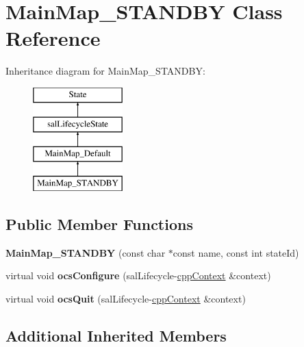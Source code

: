 \hypertarget{class_main_map___s_t_a_n_d_b_y}{\section{Main\-Map\-\_\-\-S\-T\-A\-N\-D\-B\-Y Class Reference}
\label{class_main_map___s_t_a_n_d_b_y}
}
Inheritance diagram for Main\-Map\-\_\-\-S\-T\-A\-N\-D\-B\-Y\-:\begin{figure}[H]
\begin{center}
\leavevmode
\includegraphics[height=4.000000cm]{class_main_map___s_t_a_n_d_b_y}
\end{center}
\end{figure}
\subsection*{Public Member Functions}
\begin{DoxyCompactItemize}
\item 
\hypertarget{class_main_map___s_t_a_n_d_b_y_abc2f5c4032267303b76ea7cc824f5e1b}{{\bfseries Main\-Map\-\_\-\-S\-T\-A\-N\-D\-B\-Y} (const char $\ast$const name, const int state\-Id)}\label{class_main_map___s_t_a_n_d_b_y_abc2f5c4032267303b76ea7cc824f5e1b}

\item 
\hypertarget{class_main_map___s_t_a_n_d_b_y_ad57727d529180983d334e02e9a0642d7}{virtual void {\bfseries ocs\-Configure} (sal\-Lifecycle-\/\hyperlink{classcpp_context}{cpp\-Context} \&context)}\label{class_main_map___s_t_a_n_d_b_y_ad57727d529180983d334e02e9a0642d7}

\item 
\hypertarget{class_main_map___s_t_a_n_d_b_y_adf5c00d0f404320a293bc9e3d6646231}{virtual void {\bfseries ocs\-Quit} (sal\-Lifecycle-\/\hyperlink{classcpp_context}{cpp\-Context} \&context)}\label{class_main_map___s_t_a_n_d_b_y_adf5c00d0f404320a293bc9e3d6646231}

\end{DoxyCompactItemize}
\subsection*{Additional Inherited Members}


